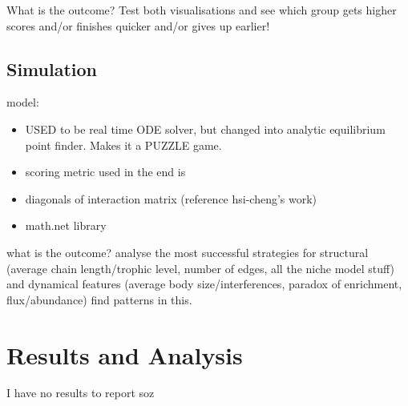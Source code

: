 What is the outcome? Test both visualisations and see which group gets higher scores and/or finishes quicker and/or gives up earlier!

\subsection{Simulation}
model:
\begin{itemize}
    \item USED to be real time ODE solver, but changed into analytic equilibrium point finder. Makes it a PUZZLE game.
    \item scoring metric used in the end is 
    \item diagonals of interaction matrix (reference hsi-cheng's work)
    \item math.net library
\end{itemize}

what is the outcome? analyse the most successful strategies for structural (average chain length/trophic level, number of edges, all the niche model stuff) and dynamical features (average body size/interferences, paradox of enrichment, flux/abundance)
find patterns in this.

\section{Results and Analysis}

I have no results to report soz
